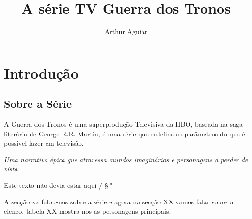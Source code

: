 \documentclass[11pt, a4paper]{report}
\author{Arthur Aguiar}
\title{A série TV Guerra dos Tronos}
\date{}
\begin{document}
\maketitle
\chapter{Introdução}
\section{Sobre a Série}

A {\huge Guerra dos Tronos} é uma superprodução Televisiva da HBO,
 baseada na saga literária de George R.R. Martin, é uma série
 que {\tiny redefine os parâmetros do que é possível fazer em televisão.}

\textit{Uma narrativa épica que atravessa mundos imaginários e personagens a perder de vista}


Este texto não devia estar aqui / § " %

A secção xx falou-nos sobre a série e agora na secção XX vamos falar sobre o elenco. tabela XX mostra-nos as personagens principais.
\end{document}
